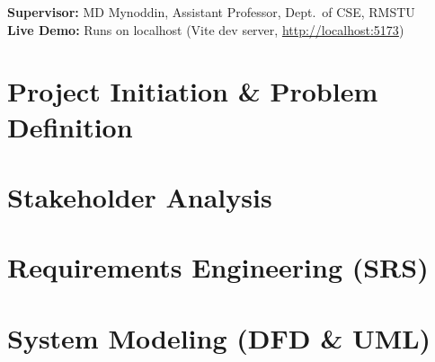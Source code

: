 \documentclass[11pt,a4paper]{report}
\begin{document}
\begin{center}
\textbf{Supervisor:} MD Mynoddin, Assistant Professor, Dept.\ of CSE, RMSTU\\[2pt]
\textbf{Live Demo:} Runs on localhost (Vite dev server, \url{http://localhost:5173})
\end{center}

\chapter{Project Initiation \& Problem Definition}
\label{sec:3-1}



\chapter{Stakeholder Analysis}
\label{sec:3-2}



\chapter{Requirements Engineering (SRS)}
\label{sec:3-3}



\chapter{System Modeling (DFD \& UML)}
\label{sec:3-4}



\end{document}
